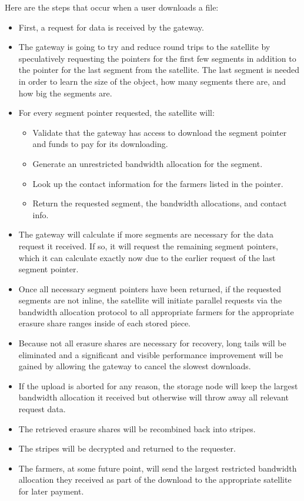 \documentclass[a4paper,10pt]{article} \usepackage[utf8]{inputenc}
\begin{document}
Here are the steps that occur when a user downloads a file:

\begin{itemize}
\item First, a request for data is received by the gateway.
\item The gateway is going to try and reduce round trips to the satellite
  by speculatively requesting the pointers for the first few segments in
  addition to the pointer for the last segment from the satellite. The last
  segment is needed in order to learn the size of the object, how many segments
  there are, and how big the segments are.
\item For every segment pointer requested, the satellite will:
  \begin{itemize}
  \item Validate that the gateway has access to download the segment pointer
    and funds to pay for its downloading.
  \item Generate an unrestricted bandwidth allocation for the segment.
  \item Look up the contact information for the farmers listed in the pointer.
  \item Return the requested segment, the bandwidth allocations, and contact
    info.
  \end{itemize}
\item The gateway will calculate if more segments are necessary for the
  data request it received. If so, it will request the remaining segment
  pointers, which it can calculate exactly now due to the earlier request of
  the last segment pointer.
\item Once all necessary segment pointers have been returned, if the requested
  segments are not inline, the satellite will initiate parallel requests
  via the bandwidth allocation protocol to all appropriate farmers for the
  appropriate erasure share ranges inside of each stored piece.
\item Because not all erasure shares are necessary for recovery, long tails
  will be eliminated and a significant and visible performance improvement will
  be gained by allowing the gateway to cancel the slowest downloads.
\item If the upload is aborted for any reason, the storage node will keep the
  largest bandwidth allocation it received but otherwise will throw away all
  relevant request data.
\item The retrieved erasure shares will be recombined back into stripes.
\item The stripes will be decrypted and returned to the requester.
\item The farmers, at some future point, will send the largest restricted
  bandwidth allocation they received as part of the download to the appropriate
  satellite for later payment.
\end{itemize}
\end{document}
